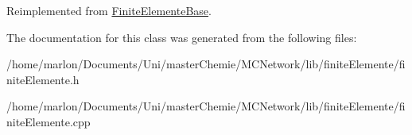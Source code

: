Reimplemented from \hyperlink{classFiniteElementeBase_abd7e36541ce728ab710166ab50fad93f}{Finite\+Elemente\+Base}.



The documentation for this class was generated from the following files\+:\begin{DoxyCompactItemize}
\item 
/home/marlon/\+Documents/\+Uni/master\+Chemie/\+M\+C\+Network/lib/finite\+Elemente/finite\+Elemente.\+h\item 
/home/marlon/\+Documents/\+Uni/master\+Chemie/\+M\+C\+Network/lib/finite\+Elemente/finite\+Elemente.\+cpp\end{DoxyCompactItemize}
